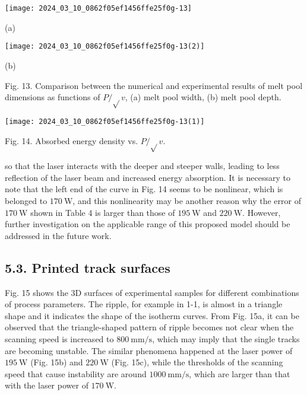 \documentclass[10pt]{article}
\begin{document}
\begin{center}
\texttt{[image: 2024\_03\_10\_0862f05ef1456ffe25f0g-13]}
\end{center}

(a)

\begin{center}
\texttt{[image: 2024\_03\_10\_0862f05ef1456ffe25f0g-13(2)]}
\end{center}

(b)

Fig. 13. Comparison between the numerical and experimental results of melt pool dimensions as functions of $P / \sqrt{ } v$, (a) melt pool width, (b) melt pool depth.

\begin{center}
\texttt{[image: 2024\_03\_10\_0862f05ef1456ffe25f0g-13(1)]}
\end{center}

Fig. 14. Absorbed energy density vs. $P / \sqrt{ } v$.

so that the laser interacts with the deeper and steeper walls, leading to less reflection of the laser beam and increased energy absorption. It is necessary to note that the left end of the curve in Fig. 14 seems to be nonlinear, which is belonged to $170 \mathrm{~W}$, and this nonlinearity may be another reason why the error of $170 \mathrm{~W}$ shown in Table 4 is larger than those of $195 \mathrm{~W}$ and $220 \mathrm{~W}$. However, further investigation on the applicable range of this proposed model should be addressed in the future work.

\subsection*{5.3. Printed track surfaces}
Fig. 15 shows the 3D surfaces of experimental samples for different combinations of process parameters. The ripple, for example in 1-1, is almost in a triangle shape and it indicates the shape of the isotherm curves. From Fig. 15a, it can be observed that the triangle-shaped pattern of ripple becomes not clear when the scanning speed is increased to $800 \mathrm{~mm} / \mathrm{s}$, which may imply that the single tracks are becoming unstable. The similar phenomena happened at the laser power of $195 \mathrm{~W}$ (Fig. 15b) and $220 \mathrm{~W}$ (Fig. 15c), while the thresholds of the scanning speed that cause instability are around $1000 \mathrm{~mm} / \mathrm{s}$, which are larger than that with the laser power of $170 \mathrm{~W}$.
\end{document}
